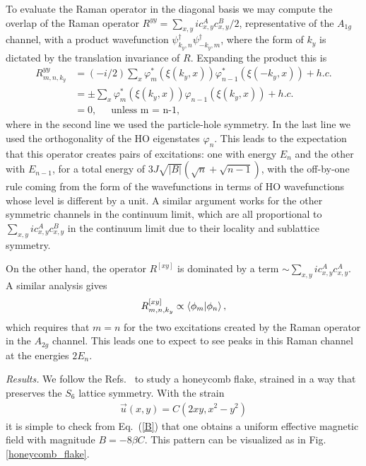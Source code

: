 \documentclass[reprint,amsmath,amssymb,aps,prl,groupedaddress,nofootinbib,superscriptaddress]{revtex4-1}
\newcommand{\1}{\mathds{1}}
\begin{document}
To evaluate the Raman operator in the diagonal basis we may compute the overlap of the Raman operator $R^{yy} = \sum_{x,y} i c^A_{x,y} c^B_{x,y} /2$, representative of the $A_{1g}$ channel, with a product wavefunction $\psi^\dagger_{k_y,n} \psi^\dagger_{-k_y,m}$, where the form of $k_y$ is dictated by the translation invariance of $R$. Expanding the product this is 
\begin{align}
R^{yy}_{m,n,k_y} &= (-i/2) \sum_{x} \varphi_m^*(\xi(k_y,x)) \varphi_{n-1}^*(\xi(-k_y,x)) + h.c. \nonumber
\\ &= \pm \sum_{x} \varphi_m^*(\xi(k_y,x)) \varphi_{n-1}(\xi(k_y,x))  + h.c. \nonumber \\ & = 0, \quad \ \ \text{unless m = n-1},
\end{align}
where in the second line we used the particle-hole symmetry. In the last line we used the orthogonality of the HO eigenstates $\varphi_n$. This leads to the expectation that this operator creates pairs of excitations: one with energy $E_n$ and the other with $E_{n-1}$, for a total energy of $3 J \sqrt{|B|} (\sqrt{n}+\sqrt{n-1})$, with the off-by-one rule coming from the form of the wavefunctions in terms of HO wavefunctions whose level is different by a unit. A similar argument works for the other symmetric channels in the continuum limit, which are all proportional to $\sum_{x,y} i c^A_{x,y} c^B_{x,y}$ in the continuum limit due to their locality and sublattice symmetry.  

On the other hand, the operator $R^{[xy]}$ is dominated by a term $\sim \sum_{x,y} i c^A_{x,y} c^A_{x,y}$. A similar analysis gives \begin{align}
R^{[xy]}_{m,n,k_y} \propto \braket{\phi_m|\phi_n},
\end{align}
which requires that $m=n$ for the two excitations created by the Raman operator in the $A_{2g}$ channel. This leads one to expect to see peaks in this Raman channel at the energies $2 E_n$.


{\it Results.} 
We follow the Refs.~\cite{Guinea10,Amal13,Rachel15} to study a honeycomb flake, strained in a way that preserves the $S_6$ lattice symmetry. With the strain%
\begin{align}
\vec{u}(x,y) = C(2xy,x^2-y^2)
\end{align}
it is simple to check from Eq.~(\ref{B}) that one obtains a uniform effective magnetic field with magnitude $B = -8 \beta C$. This pattern can be visualized as in Fig. \ref{honeycomb_flake}.
\end{document}
